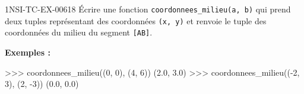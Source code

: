 \begin{exercice}{1NSI-TC-EX-006}{1}{8}
Écrire une fonction \lstinline{coordonnees_milieu(a, b)} qui prend deux tuples
représentant des coordonnées \lstinline{(x, y)} et renvoie le tuple des coordonnées
du milieu du segment \lstinline{[AB]}.

\textbf{Exemples :}
\begin{console}
>>> coordonnees_milieu((0, 0), (4, 6))
(2.0, 3.0)
>>> coordonnees_milieu((-2, 3), (2, -3))
(0.0, 0.0)
\end{console}
\end{exercice}
